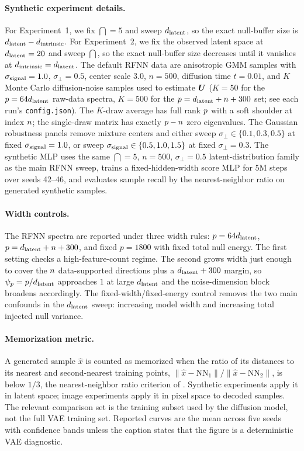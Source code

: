 \paragraph{Synthetic experiment details.}
For Experiment~1, we fix $\dint=5$ and sweep $d_{\mathrm{latent}}$, so the exact null-buffer
size is $d_{\mathrm{latent}}-d_{\mathrm{intrinsic}}$. For Experiment~2, we fix the observed latent space at
$d_{\mathrm{latent}}=20$ and sweep $\dint$, so the exact null-buffer size decreases until it
vanishes at $d_{\mathrm{intrinsic}}=d_{\mathrm{latent}}$. The default RFNN data are anisotropic GMM samples
with $\sigma_{\rm signal}=1.0$, $\sigma_\perp=0.5$, center scale $3.0$,
$n=500$, diffusion time $t=0.01$, and $K$ Monte Carlo diffusion-noise samples used to estimate $\bm{U}$ ($K=50$ for the $p=64d_{\mathrm{latent}}$ raw-data spectra, $K=500$ for the $p=d_{\mathrm{latent}}+n+300$ set; see each run's \texttt{config.json}). The $K$-draw average has full rank $p$ with a soft shoulder at index $n$; the single-draw matrix has exactly $p-n$ zero eigenvalues. The Gaussian robustness panels remove mixture centers
and either sweep $\sigma_\perp\in\{0.1,0.3,0.5\}$ at fixed
$\sigma_{\rm signal}=1.0$, or sweep
$\sigma_{\rm signal}\in\{0.5,1.0,1.5\}$ at fixed $\sigma_\perp=0.3$.
The synthetic MLP uses the same $\dint=5$, $n=500$, $\sigma_\perp=0.5$
latent-distribution family as the main RFNN sweep, trains a fixed-hidden-width
score MLP for 5M steps over seeds 42--46, and evaluates sample recall by the
nearest-neighbor ratio on generated synthetic samples.

\paragraph{Width controls.}
\label{app:width-controls}
The RFNN spectra are reported under three width rules:
$p=64d_{\mathrm{latent}}$, $p=d_{\mathrm{latent}}+n+300$, and fixed $p=1800$ with fixed total null energy.
The first setting checks a high-feature-count regime. The second grows width just enough to cover the $n$ data-supported directions plus a $d_{\mathrm{latent}}+300$ margin, so $\psi_p=p/d_{\mathrm{latent}}$ approaches $1$ at large $d_{\mathrm{latent}}$ and the noise-dimension block broadens accordingly. The
fixed-width/fixed-energy control removes the two main confounds in the $d_{\mathrm{latent}}$
sweep: increasing model width and increasing total injected null variance.

\paragraph{Memorization metric.}
A generated sample $\hat x$ is counted as memorized when the ratio of its distances to its nearest and second-nearest training points, $\|\hat x-\mathrm{NN}_1\|/\|\hat x-\mathrm{NN}_2\|$, is below $1/3$, the nearest-neighbor ratio criterion of \citet{bonnaire2025}. Synthetic experiments apply it in latent space; image experiments apply it in pixel space to decoded samples. The relevant comparison set is the training subset used
by the diffusion model, not the full VAE training set. Reported curves are the
mean across five seeds with confidence bands unless the caption states that the
figure is a deterministic VAE diagnostic.

